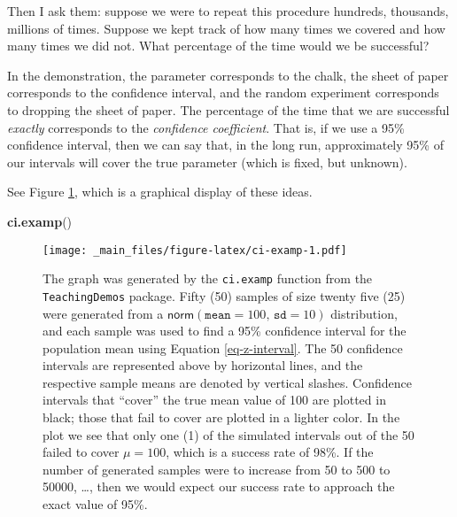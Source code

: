 \documentclass[]{book}
\newenvironment{Shaded}{\begin{snugshade}}{\end{snugshade}}
\newcommand{\KeywordTok}[1]{\textcolor[rgb]{0.13,0.29,0.53}{\textbf{{#1}}}}
\newcommand{\NormalTok}[1]{{#1}}
\numberwithin{equation}{chapter}
\numberwithin{figure}{chapter}
\theoremstyle{plain}
\theoremstyle{definition}
\theoremstyle{remark}
\theoremstyle{definition}
\theoremstyle{definition}
\theoremstyle{remark}
\begin{document}
Then I ask them: suppose we were to repeat this procedure hundreds,
thousands, millions of times. Suppose we kept track of how many times we
covered and how many times we did not. What percentage of the time would
we be successful?

In the demonstration, the parameter corresponds to the chalk, the sheet
of paper corresponds to the confidence interval, and the random
experiment corresponds to dropping the sheet of paper. The percentage of
the time that we are successful \emph{exactly} corresponds to the
\emph{confidence coefficient}. That is, if we use a 95\% confidence
interval, then we can say that, in the long run, approximately 95\% of
our intervals will cover the true parameter (which is fixed, but
unknown).

See Figure \ref{fig:ci-examp}, which is a graphical display of these
ideas.

\begin{Shaded}
\begin{Highlighting}[]
\KeywordTok{ci.examp}\NormalTok{()}
\end{Highlighting}
\end{Shaded}

\begin{figure}[htbp]
\centering
\texttt{[image: \_main\_files/figure-latex/ci-examp-1.pdf]}
\caption{\label{fig:ci-examp}\small The graph was generated by the
\texttt{ci.examp} function from the \texttt{TeachingDemos} package.
Fifty (50) samples of size twenty five (25) were generated from a
\(\mathsf{norm}(\mathtt{mean}=100,\,\mathtt{sd}=10)\) distribution, and
each sample was used to find a 95\% confidence interval for the
population mean using Equation \eqref{eq-z-interval}. The 50 confidence
intervals are represented above by horizontal lines, and the respective
sample means are denoted by vertical slashes. Confidence intervals that
``cover'' the true mean value of 100 are plotted in black; those that
fail to cover are plotted in a lighter color. In the plot we see that
only one (1) of the simulated intervals out of the 50 failed to cover
\(\mu=100\), which is a success rate of 98\%. If the number of generated
samples were to increase from 50 to 500 to 50000, \ldots{}, then we
would expect our success rate to approach the exact value of 95\%.}
\end{figure}
\end{document}
